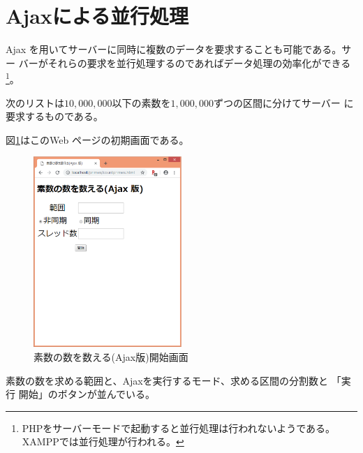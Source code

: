 \section{Ajaxによる並行処理}
Ajax を用いてサーバーに同時に複数のデータを要求することも可能である。サー
バーがそれらの要求を並行処理するのであればデータ処理の効率化ができる
\footnote{PHPをサーバーモードで起動すると並行処理は行われないようである。
XAMPPでは並行処理が行われる。}。
\begin{Exec}\upshape\label{contPrimes}
 次のリストは$10,000,000$以下の素数を$1,000,000$ずつの区間に分けてサーバー
 に要求するものである。

 図\ref{countPrimes-Ajax-start}はこのWeb ページの初期画面である。
 \begin{figure}[ht]
	\begin{center}
	 \includegraphics[width=0.5\textwidth]{primes/countPrimes-start.eps}
	\end{center}
 \caption{素数の数を数える(Ajax版)開始画面}\label{countPrimes-Ajax-start}
 \end{figure}

 素数の数を求める範囲と、Ajaxを実行するモード、求める区間の分割数と
 「実行 開始」のボタンが並んでいる。


\end{Exec}

